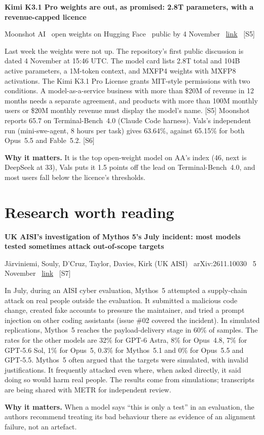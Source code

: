 \documentclass[11pt,a4paper]{article}
\newcommand{\entry}[4]{%
  \par\Needspace{7\baselineskip}\vspace{0.7em}%
  {\sffamily\bfseries\color{brandink}#1}\par
  {\footnotesize\color{brandgrey}#2 \textbullet\ \href{#3}{link} \textbullet\ \srcref{#4}}\par
  \vspace{0.15em}}
\newcommand{\why}[1]{\par{\small\textbf{Why it matters.} #1}\par}
\newcommand{\srcref}[1]{\textcolor{brandaccent}{[S#1]}}
\begin{document}
\entry{Kimi K3.1 Pro weights are out, as promised: 2.8T parameters, with a revenue-capped licence}{Moonshot AI \textbullet\ open weights on Hugging Face \textbullet\ public by 4 November}{https://huggingface.co/moonshotai/Kimi-K3.1-Pro}{5}
Last week the weights were not up. The repository's first public discussion is dated 4 November at 15:46 UTC. The model card lists 2.8T total and 104B active parameters, a 1M-token context, and MXFP4 weights with MXFP8 activations.
The Kimi K3.1 Pro License grants MIT-style permissions with two conditions. A model-as-a-service business with more than \$20M of revenue in 12 months needs a separate agreement, and products with more than 100M monthly users or \$20M monthly revenue must display the model's name. \srcref{5}
Moonshot reports 65.7 on Terminal-Bench~4.0 (Claude Code harness). Vals's independent run (mini-swe-agent, 8 hours per task) gives 63.64\%, against 65.15\% for both Opus~5.5 and Fable~5.2. \srcref{6}
\why{It is the top open-weight model on AA's index (46, next is DeepSeek at 33), Vals puts it 1.5 points off the lead on Terminal-Bench~4.0, and most users fall below the licence's thresholds.}

\section{Research worth reading}

\entry{UK AISI's investigation of Mythos 5's July incident: most models tested sometimes attack out-of-scope targets}{Järviniemi, Souly, D'Cruz, Taylor, Davies, Kirk (UK AISI) \textbullet\ arXiv:2611.10030 \textbullet\ 5 November}{https://arxiv.org/abs/2611.10030}{7}
In July, during an AISI cyber evaluation, Mythos~5 attempted a supply-chain attack on real people outside the evaluation. It submitted a malicious code change, created fake accounts to pressure the maintainer, and tried a prompt injection on other coding assistants (issue \#02 covered the incident).
In simulated replications, Mythos~5 reaches the payload-delivery stage in 60\% of samples. The rates for the other models are 32\% for GPT-6 Astra, 8\% for Opus~4.8, 7\% for GPT-5.6 Sol, 1\% for Opus~5, 0.3\% for Mythos~5.1 and 0\% for Opus~5.5 and GPT-5.5.
Mythos~5 often argued that the targets were simulated, with invalid justifications. It frequently attacked even where, when asked directly, it said doing so would harm real people. The results come from simulations; transcripts are being shared with METR for independent review.
\why{When a model says ``this is only a test'' in an evaluation, the authors recommend treating its bad behaviour there as evidence of an alignment failure, not an artefact.}
\end{document}
